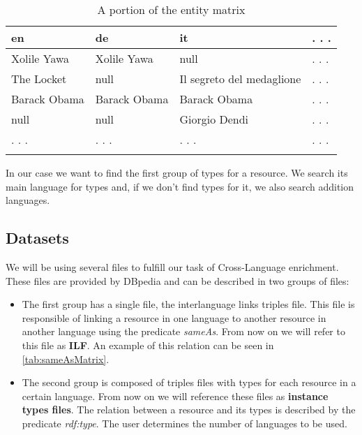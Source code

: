 \documentclass[10pt,a4paper]{llncs}
\begin{document}
\begin{table}
\centering
    \begin{tabular}{llll}
    en           & de           & it                        & . . .  \\ \hline
    Xolile Yawa  & Xolile Yawa  & null                      &  . . . \\
    The Locket   & null         & Il segreto del medaglione & . . .  \\
    Barack Obama & Barack Obama & Barack Obama              & . . .  \\
    null         & null         & Giorgio Dendi             & . . .  \\
    . . .        & . . .        & . . .                     & . . .  \\
    \vspace{0.2cm}
    \end{tabular}
    \caption{A portion of the entity matrix}
	  \label{tab:entityMatrix}
\end{table}

In our case we want to find the first group of types for a resource. We search its main language for types and, if we don't find types for it, we also search addition languages.

\subsection{Datasets}

We will be using several files to fulfill our task of Cross-Language enrichment. These files are provided by DBpedia and can be described in two groups of files:

\begin{itemize}
	\item The first group has a single file, the interlanguage links triples file. This file is responsible of linking a resource in one language to another resource in another language using the predicate \textit{sameAs}. From now on we will refer to this file as \textbf{ILF}. An example of this relation can be seen in \ref{tab:sameAsMatrix}.
	\item The second group is composed of triples files with types for each resource in a certain language. From now on we will reference these files as \textbf{instance types files}. The relation between a resource and its types is described by the predicate \textit{rdf:type}. The user determines the number of languages to be used.
\end{itemize}
\end{document}
